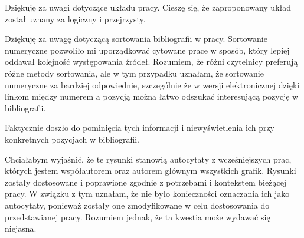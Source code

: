 \begin{frame}[t]
    \begin{block}{\tb}
    \end{block}

    \begin{block}{\tb}
    \end{block}

    Dziękuję za uwagi dotyczące układu  pracy. Cieszę się, że zaproponowany  układ został uznany za logiczny i przejrzysty. 
    \begin{block}{\tb}
    \end{block}
    {\renewcommand\normalsize{\scriptsize}%
    \normalsize
        Dziękuję za uwagę dotyczącą sortowania bibliografii w pracy. 
        Sortowanie numeryczne pozwoliło mi uporządkować cytowane prace w sposób, który lepiej oddawał kolejność występowania źródeł. 
        Rozumiem, że różni czytelnicy preferują różne metody sortowania, ale w tym przypadku uznałam, że sortowanie numeryczne za bardziej odpowiednie, szczególnie że w wersji elektronicznej dzięki linkom między numerem a pozycją można łatwo odszukać interesującą pozycję w bibliografii.
    }
\end{frame}

\begin{frame}[t]
    \begin{block}{\tb}
    \end{block}

    Faktycznie doszło do pominięcia tych informacji i niewyświetlenia ich przy konkretnych pozycjach w bibliografii.

    \begin{block}{\tb}
    \end{block}
    Chciałabym wyjaśnić, że te rysunki stanowią autocytaty z wcześniejszych prac, których jestem współautorem oraz autorem głównym wszystkich grafik. 
    Rysunki zostały dostosowane i poprawione zgodnie z potrzebami i kontekstem bieżącej pracy. 
    W związku z tym uznałam, że nie było konieczności oznaczania ich jako autocytaty, ponieważ zostały one zmodyfikowane w celu dostosowania do przedstawianej pracy. 
    Rozumiem jednak, że ta kwestia może wydawać się niejasna.
\end{frame}
  

